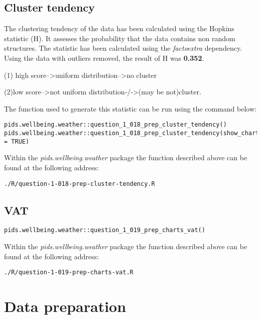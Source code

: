 \documentclass[12pt, oneside, openany]{book}
\begin{document}
\subsection*{Cluster tendency}

The clustering tendency of the data has been calculated using the Hopkins statistic (H). It assesses the probability that the data contains non random structures. The statistic has been calculated using the \emph{factoextra} dependency. Using the data with outliers removed, the result of H was \textbf{0.352}. 

(1) high score-->uniform distribution-->no cluster

(2)low score-->not uniform distribution-/->(may be not)cluster. 


The function used to generate this statistic can be run using the command below:
\begin{verbatim}
pids.wellbeing.weather::question_1_018_prep_cluster_tendency()
pids.wellbeing.weather::question_1_018_prep_cluster_tendency(show_chart = TRUE)
\end{verbatim}

Within the \emph{pids.wellbeing.weather} package the function described above can be found at the following address:

\begin{verbatim}
./R/question-1-018-prep-cluster-tendency.R
\end{verbatim}

\subsection*{VAT}

\begin{verbatim}
pids.wellbeing.weather::question_1_019_prep_charts_vat()
\end{verbatim}

Within the \emph{pids.wellbeing.weather} package the function described above can be found at the following address:

\begin{verbatim}
./R/question-1-019-prep-charts-vat.R
\end{verbatim}

\section*{Data preparation}
\end{document}
